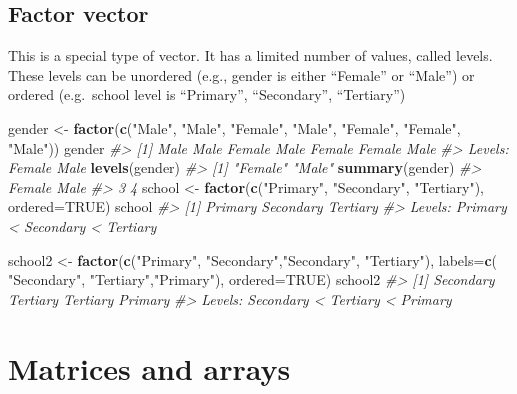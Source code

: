 \documentclass[]{book}
\newenvironment{Shaded}{}{}
\newcommand{\CommentTok}[1]{\textcolor[rgb]{0.38,0.63,0.69}{\textit{#1}}}
\newcommand{\DataTypeTok}[1]{\textcolor[rgb]{0.56,0.13,0.00}{#1}}
\newcommand{\KeywordTok}[1]{\textcolor[rgb]{0.00,0.44,0.13}{\textbf{#1}}}
\newcommand{\NormalTok}[1]{#1}
\newcommand{\OtherTok}[1]{\textcolor[rgb]{0.00,0.44,0.13}{#1}}
\newcommand{\StringTok}[1]{\textcolor[rgb]{0.25,0.44,0.63}{#1}}
\theoremstyle{definition}
\theoremstyle{definition}
\theoremstyle{definition}
\theoremstyle{remark}
\begin{document}
\hypertarget{factor-vector}{%
\subsection{Factor vector}\label{factor-vector}}

This is a special type of vector. It has a limited number of values,
called levels. These levels can be unordered (e.g., gender is either
``Female'' or ``Male'') or ordered (e.g.~school level is ``Primary'',
``Secondary'', ``Tertiary'')

\begin{Shaded}
\begin{Highlighting}[]
\NormalTok{gender <-}\StringTok{ }\KeywordTok{factor}\NormalTok{(}\KeywordTok{c}\NormalTok{(}\StringTok{"Male"}\NormalTok{, }\StringTok{"Male"}\NormalTok{, }\StringTok{"Female"}\NormalTok{, }\StringTok{"Male"}\NormalTok{, }\StringTok{"Female"}\NormalTok{, }\StringTok{"Female"}\NormalTok{, }\StringTok{"Male"}\NormalTok{))}
\NormalTok{gender}
\CommentTok{#> [1] Male   Male   Female Male   Female Female Male  }
\CommentTok{#> Levels: Female Male}
\KeywordTok{levels}\NormalTok{(gender)}
\CommentTok{#> [1] "Female" "Male"}
\KeywordTok{summary}\NormalTok{(gender)}
\CommentTok{#> Female   Male }
\CommentTok{#>      3      4}
\NormalTok{school <-}\StringTok{ }\KeywordTok{factor}\NormalTok{(}\KeywordTok{c}\NormalTok{(}\StringTok{"Primary"}\NormalTok{, }\StringTok{"Secondary"}\NormalTok{, }\StringTok{"Tertiary"}\NormalTok{),}
                    \DataTypeTok{ordered=}\OtherTok{TRUE}\NormalTok{)}
\NormalTok{school}
\CommentTok{#> [1] Primary   Secondary Tertiary }
\CommentTok{#> Levels: Primary < Secondary < Tertiary}

\NormalTok{school2 <-}\StringTok{ }\KeywordTok{factor}\NormalTok{(}\KeywordTok{c}\NormalTok{(}\StringTok{"Primary"}\NormalTok{, }\StringTok{"Secondary"}\NormalTok{,}\StringTok{"Secondary"}\NormalTok{, }\StringTok{"Tertiary"}\NormalTok{),}
                    \DataTypeTok{labels=}\KeywordTok{c}\NormalTok{( }\StringTok{"Secondary"}\NormalTok{, }\StringTok{"Tertiary"}\NormalTok{,}\StringTok{"Primary"}\NormalTok{),}
                    \DataTypeTok{ordered=}\OtherTok{TRUE}\NormalTok{)}
\NormalTok{school2}
\CommentTok{#> [1] Secondary Tertiary  Tertiary  Primary  }
\CommentTok{#> Levels: Secondary < Tertiary < Primary}
\end{Highlighting}
\end{Shaded}

\hypertarget{matrices-and-arrays}{%
\section{Matrices and arrays}\label{matrices-and-arrays}}
\end{document}
